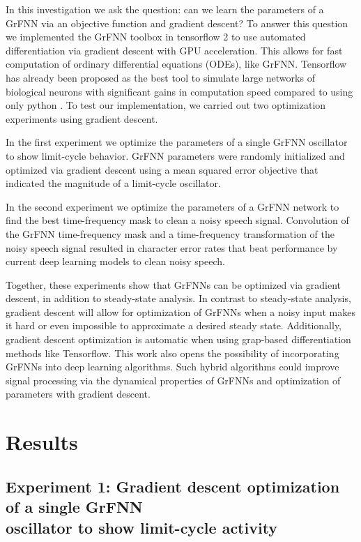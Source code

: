 \documentclass{report}
\begin{document}
In this investigation we ask the question: can we learn the parameters of a GrFNN via an objective function and gradient descent? To answer this question we implemented the GrFNN toolbox in tensorflow 2 to use automated differentiation via gradient descent with GPU acceleration. This allows for fast computation of ordinary differential equations (ODEs), like GrFNN. Tensorflow has already been proposed as the best tool to simulate large networks of biological neurons with significant gains in computation speed compared to using only python \cite{mohanta2019parallel}. To test our implementation, we carried out two optimization experiments using gradient descent.

In the first experiment we optimize the parameters of a single GrFNN oscillator to show limit-cycle behavior. GrFNN parameters were randomly initialized and optimized via gradient descent using a mean squared error objective that indicated the magnitude of a limit-cycle oscillator.

In the second experiment we optimize the parameters of a GrFNN network to find the best time-frequency mask to clean a noisy speech signal. Convolution of the GrFNN time-frequency mask and a time-frequency transformation of the noisy speech signal resulted in character error rates that beat performance by current deep learning models to clean noisy speech. 

Together, these experiments show that GrFNNs can be optimized via gradient descent, in addition to steady-state analysis. In contrast to steady-state analysis, gradient descent will allow for optimization of GrFNNs when a noisy input makes it hard or even impossible to approximate a desired steady state. Additionally, gradient descent optimization is automatic when using grap-based differentiation methods like Tensorflow. This work also opens the possibility of incorporating GrFNNs into deep learning algorithms. Such hybrid algorithms could improve signal processing via the dynamical properties of GrFNNs and optimization of parameters with gradient descent.

\section{Results}

\subsection{Experiment 1: Gradient descent optimization of a single GrFNN \\ oscillator to show limit-cycle activity} 
\end{document}
